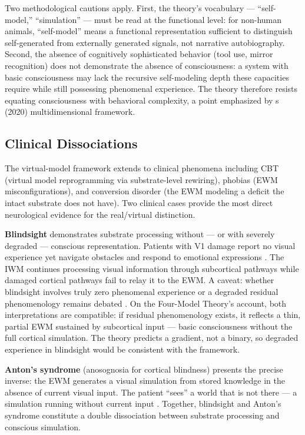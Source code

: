 \documentclass[12pt]{article}
\begin{document}
Two methodological cautions apply. First, the theory's vocabulary --- ``self-model,'' ``simulation'' --- must be read at the functional level: for non-human animals, ``self-model'' means a functional representation sufficient to distinguish self-generated from externally generated signals, not narrative autobiography. Second, the absence of cognitively sophisticated behavior (tool use, mirror recognition) does not demonstrate the absence of consciousness: a system with basic consciousness may lack the recursive self-modeling depth these capacities require while still possessing phenomenal experience. The theory therefore resists equating consciousness with behavioral complexity, a point emphasized by \citeauthor{BirchSchnellClayton2020}\textquotesingle s (2020) multidimensional framework.


\subsection{Clinical Dissociations}


The virtual-model framework extends to clinical phenomena including CBT (virtual model reprogramming via substrate-level rewiring), phobias (EWM misconfigurations), and conversion disorder (the EWM modeling a deficit the intact substrate does not have). Two clinical cases provide the most direct neurological evidence for the real/virtual distinction.

\textbf{Blindsight} demonstrates substrate processing without --- or with severely degraded --- conscious representation. Patients with V1 damage report no visual experience yet navigate obstacles and respond to emotional expressions \citep{Weiskrantz1986}. The IWM continues processing visual information through subcortical pathways while damaged cortical pathways fail to relay it to the EWM. A caveat: whether blindsight involves truly zero phenomenal experience or a degraded residual phenomenology remains debated \citep{Phillips2021}. On the Four-Model Theory's account, both interpretations are compatible: if residual phenomenology exists, it reflects a thin, partial EWM sustained by subcortical input --- basic consciousness without the full cortical simulation. The theory predicts a gradient, not a binary, so degraded experience in blindsight would be consistent with the framework.

\textbf{Anton's syndrome} (anosognosia for cortical blindness) presents the precise inverse: the EWM generates a visual simulation from stored knowledge in the absence of current visual input. The patient ``sees'' a world that is not there --- a simulation running without current input \citep{Anton1899,Aldrich1987}. Together, blindsight and Anton's syndrome constitute a double dissociation between substrate processing and conscious simulation.
\end{document}
